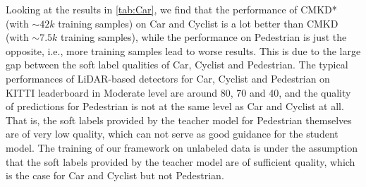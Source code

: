 \documentclass[runningheads]{llncs}
\begin{document}
Looking at the results in \cref{tab:Car}, we find that the performance of CMKD* (with $\sim42k$ training samples) on Car and Cyclist is a lot better than CMKD (with $\sim7.5k$ training samples), while the performance on Pedestrian is just the opposite, i.e., more training samples lead to worse results.
This is due to the large gap between the soft label qualities of Car, Cyclist and Pedestrian.
The typical performances of LiDAR-based detectors for Car, Cyclist and Pedestrian on KITTI leaderboard in Moderate level are around 80, 70 and 40, and the quality of predictions for Pedestrian is not at the same level as Car and Cyclist at all.
That is, the soft labels provided by the teacher model for Pedestrian themselves are of very low quality, which can not serve as good guidance for the student model.
The training of our framework on unlabeled data is under the assumption that the soft labels provided by the teacher model are of sufficient quality, which is the case for Car and Cyclist but not Pedestrian.

\begin{table*}[t]
  \small
  \centering
  \caption{Results for Car, Cyclist and Pedestrian on KITTI $test$ set. 
    CMKD is trained with the official training set KITTI $trainval$ ($\sim7.5k$) and CMKD* is trained with the unlabeled KITTI Raw ($\sim42k$).
    With unlabeled data from KITTI Raw, the performance for Car and Cyclist improves significantly, but the performance for Pedestrian instead decreases.
    }
    \label{tab:Car}
\end{table*}
\end{document}
